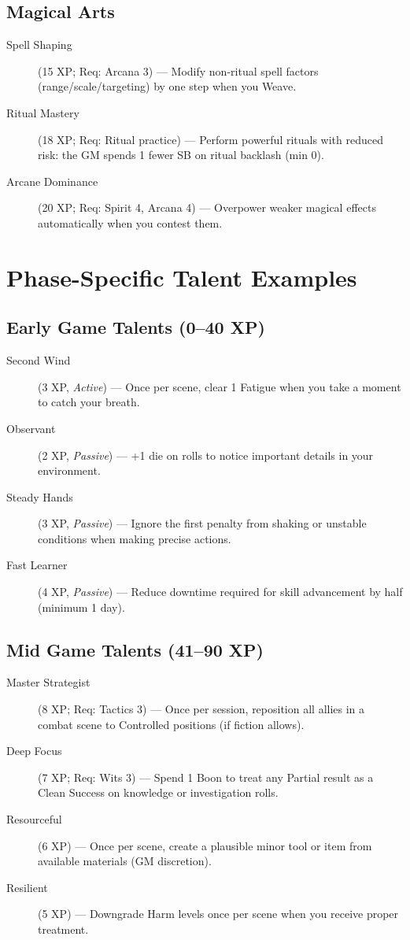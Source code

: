 \subsection*{Magical Arts}
\begin{description}
\item[Spell Shaping] (15 XP; Req: Arcana 3) --- Modify non-ritual spell factors (range/scale/targeting) by one step when you Weave.
\item[Ritual Mastery] (18 XP; Req: Ritual practice) --- Perform powerful rituals with reduced risk: the GM spends 1 fewer SB on ritual backlash (min 0).
\item[Arcane Dominance] (20 XP; Req: Spirit 4, Arcana 4) --- Overpower weaker magical effects automatically when you contest them.
\end{description}

\section{Phase-Specific Talent Examples}

\subsection*{Early Game Talents (0--40 XP)}
\begin{description}
\item[Second Wind] (3 XP, \emph{Active}) --- Once per scene, clear 1 Fatigue when you take a moment to catch your breath.
\item[Observant] (2 XP, \emph{Passive}) --- +1 die on rolls to notice important details in your environment.
\item[Steady Hands] (3 XP, \emph{Passive}) --- Ignore the first penalty from shaking or unstable conditions when making precise actions.
\item[Fast Learner] (4 XP, \emph{Passive}) --- Reduce downtime required for skill advancement by half (minimum 1 day).
\end{description}

\subsection*{Mid Game Talents (41--90 XP)}
\begin{description}
\item[Master Strategist] (8 XP; Req: Tactics 3) --- Once per session, reposition all allies in a combat scene to Controlled positions (if fiction allows).
\item[Deep Focus] (7 XP; Req: Wits 3) --- Spend 1 Boon to treat any Partial result as a Clean Success on knowledge or investigation rolls.
\item[Resourceful] (6 XP) --- Once per scene, create a plausible minor tool or item from available materials (GM discretion).
\item[Resilient] (5 XP) --- Downgrade Harm levels once per scene when you receive proper treatment.
\end{description}

